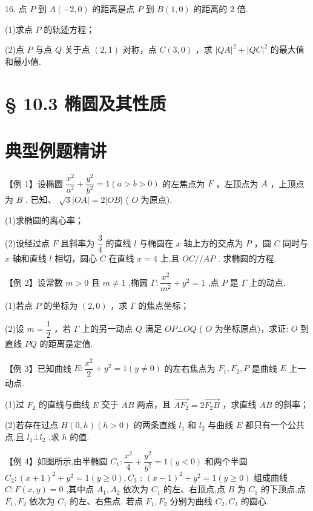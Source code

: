 16. 点 $P$ 到 $A\left( {-2,0}\right)$ 的距离是点 $P$ 到 $B\left( {1,0}\right)$ 的距离的 2 倍.

(1)求点 $P$ 的轨迹方程；

(2)点 $P$ 与点 $Q$ 关于点 $\left( {2,1}\right)$ 对称，点 $C\left( {3,0}\right)$ ，求 ${\left| QA\right| }^{2} + {\left| QC\right| }^{2}$ 的最大值和最小值.

\section*{§ 10.3 椭圆及其性质}

\section*{典型例题精讲}

【例 1】设椭圆 $\dfrac{{x}^{2}}{{a}^{2}} + \dfrac{{y}^{2}}{{b}^{2}} = 1\left( {a > b > 0}\right)$ 的左焦点为 $F$ ，左顶点为 $A$ ，上顶点为 $B$ . 已知、 $\sqrt{3}\left| {OA}\right|  = 2\left| {OB}\right|$ ( $O$ 为原点).

(1)求椭圆的离心率；

(2)设经过点 $F$ 且斜率为 $\dfrac{3}{4}$ 的直线 $l$ 与椭圆在 $x$ 轴上方的交点为 $P$ ，圆 $C$ 同时与 $x$ 轴和直线 $l$ 相切，圆心 $C$ 在直线 $x = 4$ 上,且 ${OC}//{AP}$ . 求椭圆的方程.

【例 2】设常数 $m > 0$ 且 $m \neq  1$ ,椭圆 $\Gamma  : \dfrac{{x}^{2}}{{m}^{2}} + {y}^{2} = 1$ ,点 $P$ 是 $\Gamma$ 上的动点.

(1)若点 $P$ 的坐标为 $\left( {2,0}\right)$ ，求 $\Gamma$ 的焦点坐标；

(2)设 $m = \dfrac{1}{2}$ ，若 $\Gamma$ 上的另一动点 $Q$ 满足 ${OP} \bot  {OQ}$ ( $O$ 为坐标原点)，求证: $O$ 到直线 ${PQ}$ 的距离是定值.

【例 3】已知曲线 $E : \dfrac{{x}^{2}}{2} + {y}^{2} = 1\left( {y \neq  0}\right)$ 的左右焦点为 ${F}_{1},{F}_{2},P$ 是曲线 $E$ 上一动点.

(1)过 ${F}_{2}$ 的直线与曲线 $E$ 交于 ${AB}$ 两点，且 $\overrightarrow{A{F}_{2}} = 2\overrightarrow{{F}_{2}B}$ ，求直线 ${AB}$ 的斜率；

(2)若存在过点 $H\left( {0,h}\right) \left( {h > 0}\right)$ 的两条直线 ${l}_{1}$ 和 ${l}_{2}$ 与曲线 $E$ 都只有一个公共点,且 ${l}_{1} \bot  {l}_{2}$ ,求 $h$ 的值.

【例 4】如图所示,由半椭圆 ${C}_{1} : \dfrac{{x}^{2}}{4} + \dfrac{{y}^{2}}{{b}^{2}} = 1\left( {y < 0}\right)$ 和两个半圆 ${C}_{2} : {\left( x + 1\right) }^{2} + {y}^{2} = 1\left( {y \geq  0}\right) ,{C}_{3}$ : ${\left( x - 1\right) }^{2} + {y}^{2} = 1\left( {y \geq  0}\right)$ 组成曲线 $C : F\left( {x,y}\right)  = 0$ ,其中点 ${A}_{1},{A}_{2}$ 依次为 ${C}_{1}$ 的左、右顶点,点 $B$ 为 ${C}_{1}$ 的下顶点,点 ${F}_{1},{F}_{2}$ 依次为 ${C}_{1}$ 的左、右焦点. 若点 ${F}_{1},{F}_{2}$ 分别为曲线 ${C}_{2},{C}_{3}$ 的圆心.

